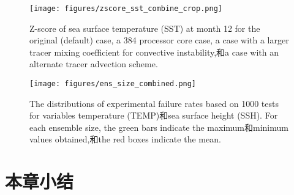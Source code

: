   
\begin {figure}[h]
\centering
\texttt{[image: figures/zscore\_sst\_combine\_crop.png]}
\caption{Z-score of sea surface temperature (SST) at month 12 for the
original (default) case, a 384 processor core case, a case with a
  larger tracer mixing coefficient for convective instability,和a case with an alternate tracer advection scheme.}
\label {fig:zscore-combine}
\end {figure}

\begin {figure}[h]
\centering
\texttt{[image: figures/ens\_size\_combined.png]}
\caption{The distributions of experimental failure rates based on 1000 tests for variables temperature (TEMP)和sea surface height (SSH).  For each ensemble size, the green bars indicate the maximum和minimum values obtained,和the red boxes indicate the mean.   }
 \label {fig:temp_ens_80}
\end {figure}

\section{本章小结}
\label{sec:verifyConclusion}
